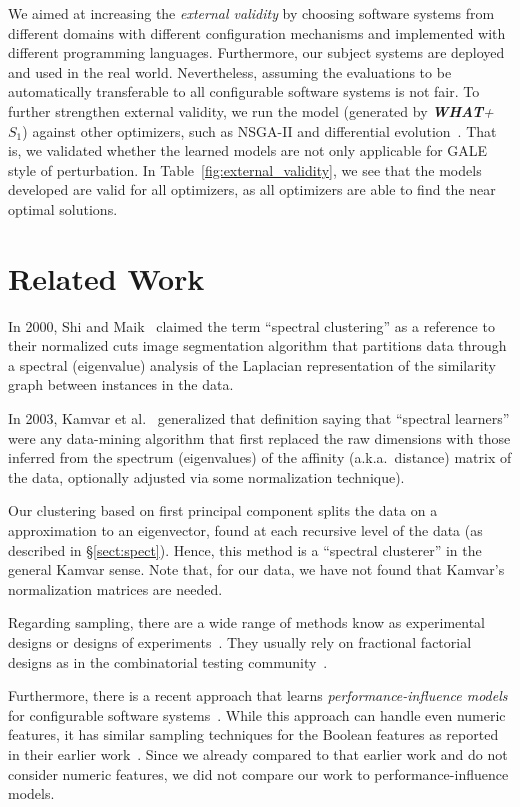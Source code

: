 \documentclass[smallextended]{svjour3}       %
\newcommand{\tion}[1]{\S\ref{sect:#1}}
\newcommand{\what}{{\bf WHAT}\xspace}
\begin{document}
  We aimed at increasing the {\em external validity} by choosing software systems from different domains with different configuration mechanisms and implemented with different programming languages. Furthermore, our subject systems  are deployed and used in the real world. Nevertheless, assuming the evaluations to be automatically transferable  to all configurable software systems is not fair. To further strengthen external validity, we run the model (generated by \textit{\what + $S_1$}) against other optimizers, such as NSGA-II and differential evolution~\cite{storn1997differential}. That is, we validated whether the learned models are not only applicable for GALE style of perturbation. In Table~\ref{fig:external_validity}, we see that the models developed are valid for all optimizers, as all optimizers are able to find the near optimal solutions.



\section{Related Work}
\label{sect:related}
 
In 2000, Shi and Maik~\cite{shi00} claimed the term ``spectral clustering'' as a reference to their normalized cuts
image
segmentation algorithm that  partitions data through a spectral (eigenvalue) analysis of the  
Laplacian representation of the similarity graph between instances in the data.

In 2003, Kamvar et al.~\cite{kamvar2003spectral}  generalized that definition saying that ``spectral learners''
were any data-mining algorithm that first replaced the raw
dimensions with those inferred from the spectrum (eigenvalues) of the affinity (a.k.a.\ distance)
matrix of the data, optionally adjusted via some normalization technique).

Our clustering based on first principal component splits the data on a   approximation to an eigenvector, found at each recursive level
of the data (as described in \tion{spect}). 
Hence, this  method is a ``spectral clusterer'' in the general Kamvar sense. 
Note that,
for our data, we have
not found that Kamvar's normalization matrices are needed.

Regarding sampling, there are a wide range of methods know as experimental designs or designs of experiments~\cite{pukelsheim2006optimal}. They usually rely on fractional factorial designs as in the combinatorial testing community~\cite{Kuhn:2013}. 

Furthermore, there is a recent approach that learns {\em per\-for\-mance-influence models} for configurable software systems~\cite{SGA+15}. While this approach can handle even numeric features, it has similar sampling techniques for the Boolean features as reported in their earlier work~\cite{siegmund2012predicting}. Since we already compared to that earlier work and do not consider numeric features, we did not compare our work to performance-influence models.
 
\end{document}
